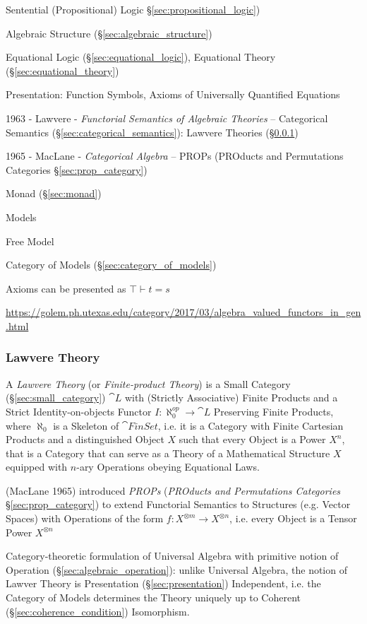 Sentential (Propositional) Logic \S\ref{sec:propositional_logic})

Algebraic Structure (\S\ref{sec:algebraic_structure})

Equational Logic (\S\ref{sec:equational_logic}),
Equational Theory (\S\ref{sec:equational_theory})

Presentation: Function Symbols, Axioms of Universally Quantified
Equations

1963 - Lawvere - \emph{Functorial Semantics of Algebraic Theories} --
Categorical Semantics (\S\ref{sec:categorical_semantics}): Lawvere Theories
(\S\ref{sec:lawvere_theory})

1965 - MacLane - \emph{Categorical Algebra} -- PROPs (PROducts and Permutations
Categories \S\ref{sec:prop_category})

Monad (\S\ref{sec:monad})

Models

Free Model

Category of Models (\S\ref{sec:category_of_models})

Axioms can be presented as $\top \vdash t = s$


\url{https://golem.ph.utexas.edu/category/2017/03/algebra_valued_functors_in_gen.html}



\subsubsection{Lawvere Theory}\label{sec:lawvere_theory}

A \emph{Lawvere Theory} (or \emph{Finite-product Theory}) is a Small Category
(\S\ref{sec:small_category}) $\cat{L}$ with (Strictly Associative) Finite
Products and a Strict Identity-on-objects Functor $I : \aleph_0^{op}
\rightarrow \cat{L}$ Preserving Finite Products, where $\aleph_0$ is a Skeleton
of $\cat{FinSet}$, i.e. it is a Category with Finite Cartesian Products and a
distinguished Object $X$ such that every Object is a Power $X^n$, that is a
Category that can serve as a Theory of a Mathematical Structure $X$ equipped
with $n$-ary Operations obeying Equational Laws.

\fist (MacLane 1965) introduced \emph{PROPs} (\emph{PROducts and Permutations
  Categories} \S\ref{sec:prop_category}) to extend Functorial Semantics to
Structures (e.g. Vector Spaces) with Operations of the form $f : X^{\otimes m}
\rightarrow X^{\otimes n}$, i.e. every Object is a Tensor Power $X^{\otimes n}$

Category-theoretic formulation of Universal Algebra with primitive notion of
Operation (\S\ref{sec:algebraic_operation}): unlike Universal Algebra, the
notion of Lawver Theory is Presentation (\S\ref{sec:presentation}) Independent,
i.e. the Category of Models determines the Theory uniquely up to Coherent
(\S\ref{sec:coherence_condition}) Isomorphism. \cite{hyland-power06}

